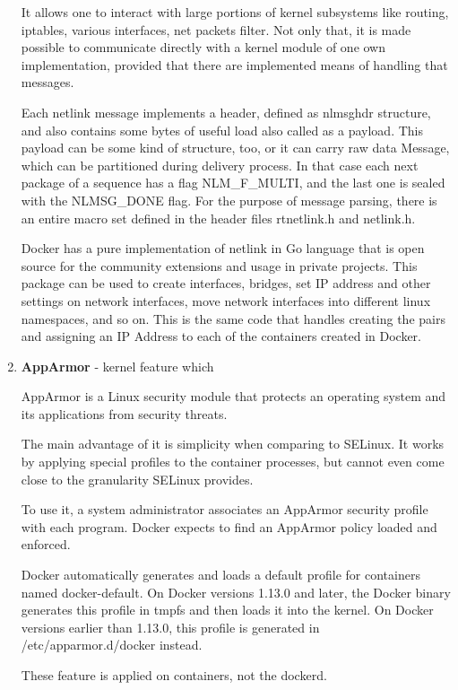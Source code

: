 \begin{enumerate}
It allows one to interact with large portions of kernel subsystems
like routing, iptables, various interfaces, net packets filter.
Not only that, it is made possible to communicate directly with a kernel
module of one own implementation, provided that
there are implemented means of handling that messages.

Each netlink message implements a header,
defined as nlmsghdr structure,
and also contains some bytes of useful load also called as a payload.
This payload can be some kind of structure, too, or it can carry raw data
Message, which can be partitioned during delivery process.
In that case each next package of a sequence has a flag NLM\_F\_MULTI,
and the last one is sealed with the NLMSG\_DONE flag.
For the purpose of message parsing, there is an entire macro set
defined in the header files rtnetlink.h and netlink.h\cite{NetlinkPacket}.

Docker has a pure implementation of netlink
in Go language that is open source for the community extensions
and usage in private projects.
This package can be used to create interfaces,
bridges, set IP address and other settings on network interfaces,
move network interfaces into different linux namespaces,
and so on.
This is the same code that handles creating the pairs and assigning
an IP Address to each of the containers created in Docker.

\item \textbf{AppArmor} - kernel feature which
\begin{definition}
AppArmor is a Linux security module
that protects an operating system and its applications from security threats.
\end{definition}

The main advantage of it is simplicity when comparing to SELinux.
It works by applying special profiles to the container processes,
but cannot even come close
to the granularity SELinux provides\cite{AdrMouAppArmor:2016}.

To use it, a system administrator associates an
AppArmor security profile with each program.
Docker expects to find an AppArmor policy loaded and enforced.

Docker automatically generates and loads a default profile for containers
named docker-default. On Docker versions 1.13.0 and later, the Docker
binary generates this profile in tmpfs and then loads it into the kernel.
On Docker versions earlier than 1.13.0, this
profile is generated in /etc/apparmor.d/docker instead.

These feature is applied on containers, not the dockerd.


\end{enumerate}
